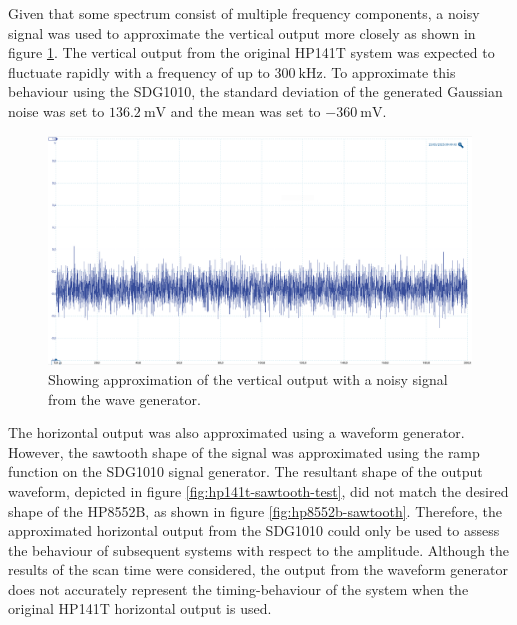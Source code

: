 \documentclass[class=report,11pt,crop=false]{standalone}
\begin{document}
	Given that some spectrum consist of multiple frequency components, a noisy signal was used to approximate the vertical output more closely as shown in figure \ref{fig:noisy-vertical}. The vertical output from the original HP141T system was expected to fluctuate rapidly with a frequency of up to $\SI{300}{\kilo\hertz}$. To approximate this behaviour using the SDG1010, the standard deviation of the generated Gaussian noise was set to $\SI{136.2}{\milli\volt}$ and the mean was set to $-\SI{360}{\milli\volt}$. 
	\begin{figure}[ht!]
		\centering
		\includegraphics[width=0.64\linewidth]{Figures/Results/hp141t-noisy}
		\caption{Showing approximation of the vertical output with a noisy signal from the wave generator.}
		\label{fig:noisy-vertical}
	\end{figure} 
	
	The horizontal output was also approximated using a waveform generator. However, the sawtooth shape of the signal was approximated using the ramp function on the SDG1010 signal generator. The resultant shape of the output waveform, depicted in figure \ref{fig:hp141t-sawtooth-test}, did not match the desired shape of the HP8552B, as shown in figure \ref{fig:hp8552b-sawtooth}. Therefore, the approximated horizontal output from the SDG1010 could only be used to assess the behaviour of subsequent systems with respect to the amplitude. Although the results of the scan time were considered, the output from the waveform generator does not accurately represent the timing-behaviour of the system when the original HP141T horizontal output is used.
	
\end{document}
